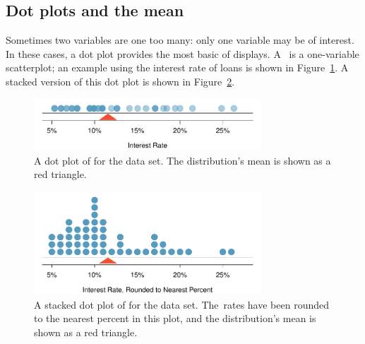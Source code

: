 \subsection{Dot plots and the mean}
\label{dotPlot}

Sometimes two variables are one too many:
only one variable may be of interest.
In these cases, a dot plot provides the most basic of displays.
A~ is a one-variable scatterplot;
an example using the interest rate of \loanN{} loans
is shown in Figure~\ref{loan_int_rate_dot_plot}.
A stacked version of this dot plot is shown in
Figure~\ref{loan_int_rate_dot_plot_stacked}.

\begin{figure}[h]
   \centering
   \includegraphics[width=0.76\textwidth]{ch_summarizing_data/figures/loan_int_rate_dot_plot/loan_int_rate_dot_plot}
   \caption{A dot plot of 
       for the  data set.
       The distribution's mean is shown as a red triangle.}
   \label{loan_int_rate_dot_plot}
\end{figure}

\begin{figure}[h]
   \centering
   \includegraphics[width=0.76\textwidth]{ch_summarizing_data/figures/loan_int_rate_dot_plot/loan_int_rate_dot_plot_stacked}
   \caption{A stacked dot plot of
       for the  data set.
       The~rates have been rounded to the nearest
       percent in this plot, and the
       distribution's mean is shown as a red triangle.}
   \label{loan_int_rate_dot_plot_stacked}
\end{figure}

